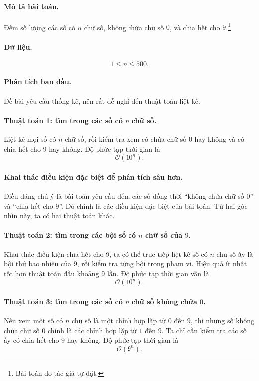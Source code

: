\documentclass[11pt]{article}
\newcommand{\Oh}{\mathcal{O}}
\begin{document}
\paragraph{Mô tả bài toán.}
Đếm số lượng các số có \(n\) chữ số, không chứa chữ số \(0\), và chia hết cho
\(9\).\footnote{Bài toán do tác giả tự đặt.}

\paragraph{Dữ liệu.}
\[
  1\le n\le 500.
\]

\paragraph{Phân tích ban đầu.}
Đề bài yêu cầu thống kê, nên rất dễ nghĩ đến thuật toán liệt kê.

\paragraph{Thuật toán 1: tìm trong các số có \(n\) chữ số.}
Liệt kê mọi số có \(n\) chữ số, rồi kiểm tra xem có chứa chữ số \(0\) hay
không và có chia hết cho \(9\) hay không. Độ phức tạp thời gian là
\[
  \Oh(10^n).
\]

\paragraph{Khai thác điều kiện đặc biệt để phân tích sâu hơn.}
Điều đáng chú ý là bài toán yêu cầu đếm các số đồng thời ``không chứa chữ số
\(0\)'' và ``chia hết cho \(9\)''. Đó chính là các điều kiện đặc biệt của bài
toán. Từ hai góc nhìn này, ta có hai thuật toán khác.

\paragraph{Thuật toán 2: tìm trong các bội số có \(n\) chữ số của \(9\).}
Khai thác điều kiện chia hết cho \(9\), ta có thể trực tiếp liệt kê số có
\(n\) chữ số ấy là bội thứ bao nhiêu của \(9\), rồi kiểm tra từng bội trong
phạm vi. Hiệu quả ít nhất tốt hơn thuật toán đầu khoảng \(9\) lần. Độ phức
tạp thời gian vẫn là
\[
  \Oh(10^n).
\]

\paragraph{Thuật toán 3: tìm trong các số có \(n\) chữ số không chứa \(0\).}
Nếu xem một số có \(n\) chữ số là một chỉnh hợp lặp từ \(0\) đến \(9\), thì
những số không chứa chữ số \(0\) chính là các chỉnh hợp lặp từ \(1\) đến \(9\).
Ta chỉ cần kiểm tra các số ấy có chia hết cho \(9\) hay không. Độ phức tạp
thời gian là
\[
  \Oh(9^n).
\]
\end{document}
